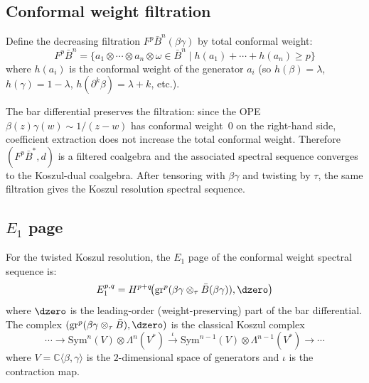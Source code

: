 \subsection{Conformal weight filtration}

\begin{definition}
\label{def:conformal-weight-filtration}
Define the decreasing filtration $F^p \bar{B}^n(\beta\gamma)$ by
total conformal weight:
\begin{equation}\label{eq:conf-weight-filtration}
F^p \bar{B}^n = \bigl\{
a_1 \otimes \cdots \otimes a_n \otimes \omega \in \bar{B}^n
\;\big|\;
h(a_1) + \cdots + h(a_n) \geq p \bigr\}
\end{equation}
where $h(a_i)$ is the conformal weight of the generator $a_i$
(so $h(\beta) = \lambda$, $h(\gamma) = 1-\lambda$,
$h(\partial^k \beta) = \lambda + k$, etc.).
\end{definition}

The bar differential preserves the filtration: since the OPE
$\beta(z)\gamma(w) \sim 1/(z-w)$ has conformal weight~$0$ on the
right-hand side, coefficient extraction does not increase the total
conformal weight. Therefore $(F^p \bar{B}^*, d)$ is a filtered
coalgebra and the associated spectral sequence converges to the
Koszul-dual coalgebra. After tensoring with $\beta\gamma$ and
twisting by $\tau$, the same filtration gives the Koszul resolution
spectral sequence.

\subsection{\texorpdfstring{$E_1$}{E1} page}

\begin{proposition}
\label{prop:betagamma-E1-page}
For the twisted Koszul resolution, the $E_1$ page of the conformal
weight spectral sequence is:
\begin{equation}\label{eq:betagamma-E1}
E_1^{p,q} =
H^{p+q}\!\bigl(\mathrm{gr}^p(
\beta\gamma\otimes_\tau\bar{B}(\beta\gamma)), \dzero\bigr)
\end{equation}
where $\dzero$ is the leading-order (weight-preserving) part of
the bar differential. The complex
$(\mathrm{gr}^p(\beta\gamma\otimes_\tau\bar B), \dzero)$ is the
classical Koszul complex
\begin{equation}\label{eq:classical-koszul}
\cdots \to \mathrm{Sym}^n(V) \otimes \Lambda^n(V^*)
\xrightarrow{\;\iota\;} \mathrm{Sym}^{n-1}(V)
\otimes \Lambda^{n-1}(V^*) \to \cdots
\end{equation}
where $V = \mathbb{C}\langle \beta, \gamma \rangle$ is the
$2$-dimensional space of generators and $\iota$ is the
contraction map.
\end{proposition}

